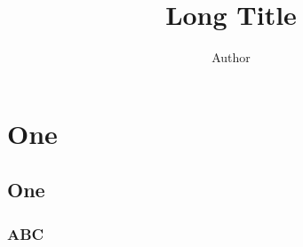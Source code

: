 \documentclass[compress,black]{beamer}
\title{Long Title}
\author{Author}
\begin{document}
\begin{frame}
    \titlepage
\end{frame}

\section{One}
\subsection{One}
\begin{frame}
    \frametitle{ABC}
\end{frame}
\end{document}
